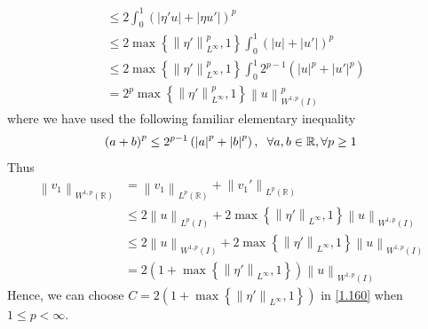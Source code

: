 \documentclass[a4paper,oneside]{article}
\numberwithin{equation}{section}
\begin{document}
\begin{enumerate}
\begin{align}
 &\le 2\int_0^1 {{{\left( {\left| {\eta 'u} \right| + \left| {\eta u'} \right|} \right)}^p}} \\
& \le 2\max \left\{ {\left\| {\eta '} \right\|_{{L^\infty }}^p,1} \right\}\int_0^1 {{{\left( {\left| u \right| + \left| {u'} \right|} \right)}^p}} \\
& \le 2\max \left\{ {\left\| {\eta '} \right\|_{{L^\infty }}^p,1} \right\}\int_0^1 {{2^{p - 1}}\left( {{{\left| u \right|}^p} + {{\left| {u'} \right|}^p}} \right)} \\
& = {2^p}\max \left\{ {\left\| {\eta '} \right\|_{{L^\infty }}^p,1} \right\}{\left\| u \right\|_{{W^{1,p}}\left( I \right)}^p}
\end{align}
where we have used the following familiar elementary inequality
\begin{align}
\label{1.185}
{\left( {a + b} \right)^p} \le {2^{p - 1}}\left( {{{\left| a \right|}^p} + {{\left| b \right|}^p}} \right),\hspace{0.2cm}\forall a,b \in \mathbb{R},\forall p \ge 1
\end{align}
Thus 
\begin{align}
{\left\| {{v_1}} \right\|_{{W^{1,p}}\left( \mathbb{R} \right)}} &= {\left\| {{v_1}} \right\|_{{L^p}\left( \mathbb{R} \right)}} + {\left\| {{v_1}'} \right\|_{{L^p}\left( \mathbb{R} \right)}}\\
& \le 2{\left\| u \right\|_{{L^p}\left( I \right)}} + 2\max \left\{ {{{\left\| {\eta '} \right\|}_{{L^\infty }}},1} \right\}{\left\| u \right\|_{{W^{1,p}}\left( I \right)}}\\
& \le 2{\left\| u \right\|_{{W^{1,p}}\left( I \right)}} + 2\max \left\{ {{{\left\| {\eta '} \right\|}_{{L^\infty }}},1} \right\}{\left\| u \right\|_{{W^{1,p}}\left( I \right)}}\\
& = 2\left( {1 + \max \left\{ {{{\left\| {\eta '} \right\|}_{{L^\infty }}},1} \right\}} \right){\left\| u \right\|_{{W^{1,p}}\left( I \right)}}
\end{align}
Hence, we can choose $C = 2\left( {1 + \max \left\{ {{{\left\| {\eta '} \right\|}_{{L^\infty }}},1} \right\}} \right)$ in \eqref{1.160} when $1\le p<\infty$.
\end{enumerate}
\end{document}
